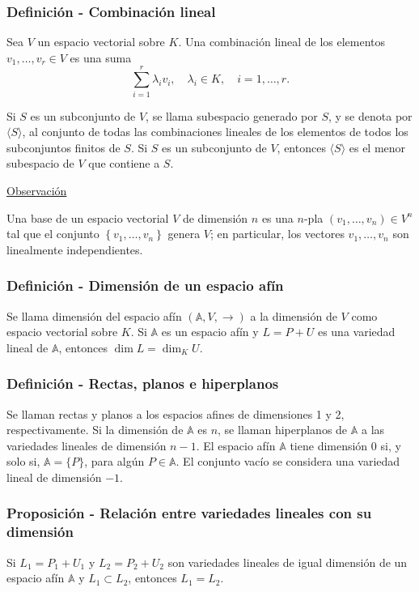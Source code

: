 \documentclass[12pt, a4paper, ones, notitlepage, openany,titlepage]{article}
\begin{document}
\subsubsection{Definición - Combinación lineal}
Sea $V$ un espacio vectorial sobre $K$. Una combinación lineal de los elementos $v_{1}, \ldots, v_{r} \in V$ es una suma
$$
\sum_{i=1}^{r} \lambda_{i} v_{i}, \quad \lambda_{i} \in K, \quad i=1, \ldots, r .
$$

Si $S$ es un subconjunto de $V$, se llama subespacio generado por $S$, y se denota por $\langle S\rangle$, al conjunto de todas las combinaciones lineales de los elementos de todos los subconjuntos finitos de $S$. Si $S$ es un subconjunto de $V$, entonces $\langle S\rangle$ es el menor subespacio de $V$ que contiene a $S$.

\noindent\underline{Observación}

Una base de un espacio vectorial $V$ de dimensión $n$ es una $n$-pla $\left(v_{1}, \ldots, v_{n}\right) \in V^{n}$ tal que el conjunto $\left\{v_{1}, \ldots, v_{n}\right\}$ genera $V$; en particular, los vectores $v_{1}, \ldots, v_{n}$ son linealmente independientes.

\subsubsection{Definición - Dimensión de un espacio afín}
Se llama dimensión del espacio afín $(\mathbb{A}, V, \rightarrow)$ a la dimensión de $V$ como espacio vectorial sobre $K$. Si $\mathbb{A}$ es un espacio afín y $L=P+U$ es una variedad lineal de $\mathbb{A}$, entonces $\dim  L=\dim _{K} U$.

\subsubsection{Definición - Rectas, planos e hiperplanos}
Se llaman rectas y planos a los espacios afines de dimensiones 1 y 2, respectivamente. Si la dimensión de $\mathbb{A}$ es $n$, se llaman hiperplanos de $\mathbb{A}$ a las variedades lineales de dimensión $n-1$. El espacio afín $\mathbb{A}$ tiene dimensión 0 si, y solo si, $\mathbb{A}=\{P\}$, para algún $P \in \mathbb{A}$. El conjunto vacío se considera una variedad lineal de dimensión $-1$.

\subsubsection{Proposición - Relación entre variedades lineales con su dimensión}
Si $L_{1}=P_{1}+U_{1}$ y $L_{2}=P_{2}+U_{2}$ son variedades lineales de igual dimensión de un espacio afín $\mathbb{A}$ y $L_{1} \subset L_{2}$, entonces $L_{1}=L_{2}$.
\end{document}
